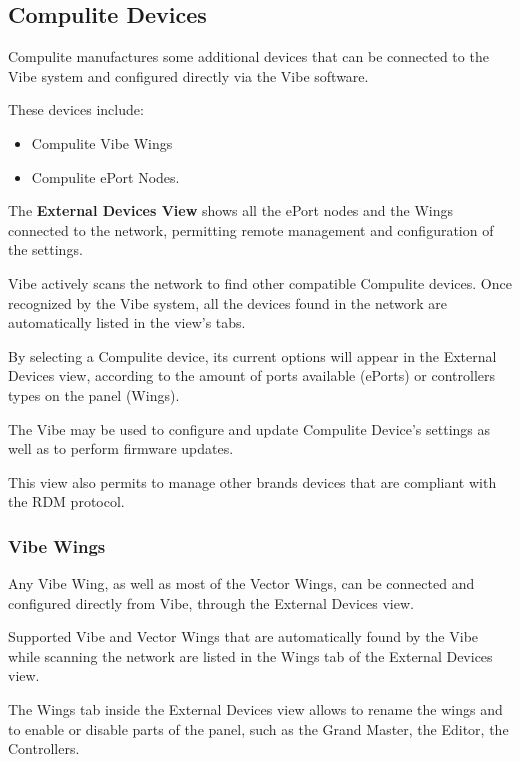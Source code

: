 \documentclass[
]{article}
\begin{document}
\hypertarget{Compulite-Devices-17.2}{%
\subsection{Compulite Devices}\label{Compulite-Devices-17.2}}

Compulite manufactures some additional devices that can be connected to the Vibe system and configured directly via the Vibe software.

These devices include:

\begin{itemize}
\item
  Compulite Vibe Wings
\item
  Compulite ePort Nodes.
\end{itemize}

The \textbf{External Devices View} shows all the ePort nodes and the Wings connected to the network, permitting remote management and configuration of the settings.

Vibe actively scans the network to find other compatible Compulite devices. Once recognized by the Vibe system, all the devices found in the network are automatically listed in the view's tabs.

By selecting a Compulite device, its current options will appear in the External Devices view, according to the amount of ports available (ePorts) or controllers types on the panel (Wings).

The Vibe may be used to configure and update Compulite Device's settings as well as to perform firmware updates.

This view also permits to manage other brands devices that are compliant with the RDM protocol.

\hypertarget{vibe-wings}{%
\subsubsection{Vibe Wings}\label{vibe-wings}}

Any Vibe Wing, as well as most of the Vector Wings, can be connected and configured directly from Vibe, through the External Devices view.

Supported Vibe and Vector Wings that are automatically found by the Vibe while scanning the network are listed in the Wings tab of the External Devices view.

The Wings tab inside the External Devices view allows to rename the wings and to enable or disable parts of the panel, such as the Grand Master, the Editor, the Controllers.
\end{document}
